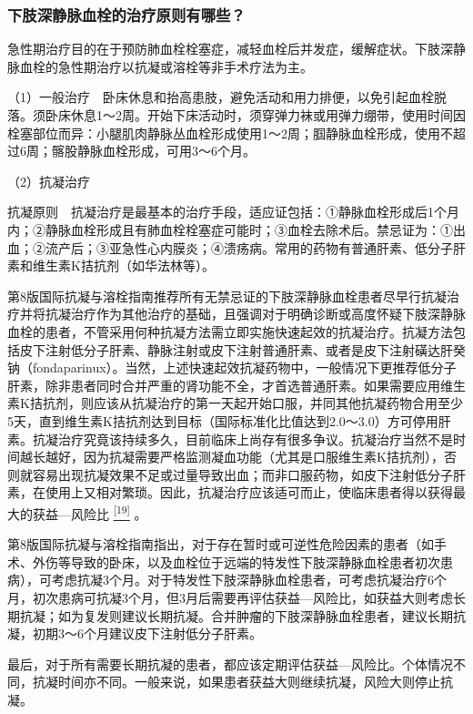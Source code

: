 \subsubsection{下肢深静脉血栓的治疗原则有哪些？}

急性期治疗目的在于预防肺血栓栓塞症，减轻血栓后并发症，缓解症状。下肢深静脉血栓的急性期治疗以抗凝或溶栓等非手术疗法为主。

（1）一般治疗　卧床休息和抬高患肢，避免活动和用力排便，以免引起血栓脱落。须卧床休息1～2周。开始下床活动时，须穿弹力袜或用弹力绷带，使用时间因栓塞部位而异：小腿肌肉静脉丛血栓形成使用1～2周；腘静脉血栓形成，使用不超过6周；髂股静脉血栓形成，可用3～6个月。

（2）抗凝治疗

抗凝原则　抗凝治疗是最基本的治疗手段，适应证包括：①静脉血栓形成后1个月内；②静脉血栓形成且有肺血栓栓塞症可能时；③血栓去除术后。禁忌证为：①出血；②流产后；③亚急性心内膜炎；④溃疡病。常用的药物有普通肝素、低分子肝素和维生素K拮抗剂（如华法林等）。

第8版国际抗凝与溶栓指南推荐所有无禁忌证的下肢深静脉血栓患者尽早行抗凝治疗并将抗凝治疗作为其他治疗的基础，且强调对于明确诊断或高度怀疑下肢深静脉血栓的患者，不管采用何种抗凝方法需立即实施快速起效的抗凝治疗。抗凝方法包括皮下注射低分子肝素、静脉注射或皮下注射普通肝素、或者是皮下注射磺达肝癸钠（fondaparinux）。当然，上述快速起效抗凝药物中，一般情况下更推荐低分子肝素，除非患者同时合并严重的肾功能不全，才首选普通肝素。如果需要应用维生素K拮抗剂，则应该从抗凝治疗的第一天起开始口服，并同其他抗凝药物合用至少5天，直到维生素K拮抗剂达到目标（国际标准化比值达到2.0～3.0）方可停用肝素。抗凝治疗究竟该持续多久，目前临床上尚存有很多争议。抗凝治疗当然不是时间越长越好，因为抗凝需要严格监测凝血功能（尤其是口服维生素K拮抗剂），否则就容易出现抗凝效果不足或过量导致出血；而非口服药物，如皮下注射低分子肝素，在使用上又相对繁琐。因此，抗凝治疗应该适可而止，使临床患者得以获得最大的获益---风险比
\protect\hyperlink{text00022.htmlux5cux23ch19-21}{\textsuperscript{{[}19{]}}}
。

第8版国际抗凝与溶栓指南指出，对于存在暂时或可逆性危险因素的患者（如手术、外伤等导致的卧床，以及血栓位于远端的特发性下肢深静脉血栓患者初次患病），可考虑抗凝3个月。对于特发性下肢深静脉血栓患者，可考虑抗凝治疗6个月，初次患病可抗凝3个月，但3月后需要再评估获益---风险比，如获益大则考虑长期抗凝；如为复发则建议长期抗凝。合并肿瘤的下肢深静脉血栓患者，建议长期抗凝，初期3～6个月建议皮下注射低分子肝素。

最后，对于所有需要长期抗凝的患者，都应该定期评估获益---风险比。个体情况不同，抗凝时间亦不同。一般来说，如果患者获益大则继续抗凝，风险大则停止抗凝。


